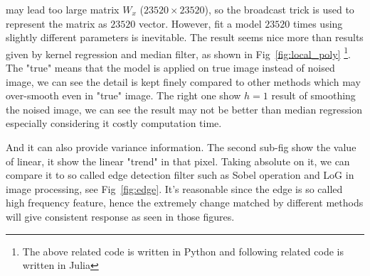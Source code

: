 \documentclass{article}
\begin{document}
may lead too large matrix $W_x$ ($23520 \times 23520$), so the broadcast trick is used to represent the matrix as 
$23520$ vector. However, fit a model $23520$ times using slightly different parameters is inevitable. 
The result seems nice more than results given by kernel regression and median filter, 
as shown in Fig~\ref{fig:local_poly} \footnote{The above related code is written in Python and following related code is written in Julia}.  
The "true" means that the model is applied on true image instead of noised image,
we can see the detail is kept finely compared to other methods which may over-smooth even in "true" image.
The right one show $h=1$ result of smoothing the noised image, we can see the result may not be better than median regression especially considering
it costly computation time. 

And it can also provide variance information. The second sub-fig show the value of linear, it show the linear
"trend" in that pixel. Taking absolute on it, we can compare it to so called edge detection filter such as Sobel operation and LoG
in image processing, see Fig~\ref{fig:edge}. It's reasonable since the edge is so called high frequency feature, hence the extremely
change matched by different methods will give consistent response as seen in those figures.
\end{document}
